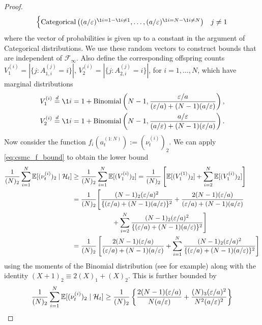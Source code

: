 \begin{proof}
\begin{align*}
\begin{cases}
\operatorname{Categorical}\left( (a/\varepsilon)^{\1{i=1} -\1{i\neq 1}} ,\dots, (a/\varepsilon)^{\1{i=N} -\1{i\neq N}} \right) & j\neq 1
 \end{cases}
\end{align*}
where the vector of probabilities is given up to a constant in the argument of Categorical distributions.
We use these random vectors to construct bounds that are independent of $\mathcal{F}_\infty$.
Also define the corresponding offspring counts $V_1^{(i)} = |\{j: A_{1,i}^{(j)}=i\}|$, $V_2^{(i)} = |\{j: A_{2,i}^{(j)}=i\}|$, for $i=1,\dots,N$, which have marginal distributions
\begin{align*}
& V_1^{(i)} \overset{d}{=} \1{i=1} + \operatorname{Binomial}\left(N-1, \frac{\varepsilon/a}{(\varepsilon/a) + (N-1)(a/\varepsilon)} \right) , \\
& V_2^{(i)} \overset{d}{=} \1{i=1} + \operatorname{Binomial}\left( N-1, \frac{a/\varepsilon}{(a/\varepsilon) + (N-1)(\varepsilon/a)} \right) .
\end{align*}
Now consider the function $f_i(a_t^{(1:N)}) := (\nu_t^{(i)})_2$. We can apply \eqref{eq:csmc_f_bound} to obtain the lower bound
\begin{align*}
\frac{1}{(N)_2} \sum_{i=1}^N \mathbb{E}[ (\nu_t^{(i)})_2 \mid \mathcal{H}_t ]
&\geq \frac{1}{(N)_2} \sum_{i=1}^N \mathbb{E}[ (V_1^{(i)})_2 ]
=  \frac{1}{(N)_2} \left[ \mathbb{E}[ (V_1^{(1)})_2 ] + \sum_{i=2}^N \mathbb{E}[ (V_1^{(i)})_2 ] \right] \\
&= \frac{1}{(N)_2} \Bigg[ \frac{(N-1)_2 (\varepsilon/a)^2}{\{(\varepsilon/a) + (N-1)(a/\varepsilon)\}^2} + \frac{2(N-1)(\varepsilon/a)}{(\varepsilon/a) + (N-1)(a/\varepsilon)}  \\
&\qquad\qquad\qquad + \sum_{i=2}^N \frac{(N-1)_2 (\varepsilon/a)^2}{\{(\varepsilon/a) + (N-1)(a/\varepsilon)\}^2} \Bigg] \\
&= \frac{1}{(N)_2} \left[ \frac{2(N-1)(\varepsilon/a)}{(\varepsilon/a) + (N-1)(a/\varepsilon)} + \sum_{i=1}^N \frac{(N-1)_2 (\varepsilon/a)^2}{\{(\varepsilon/a) + (N-1)(a/\varepsilon)\}^2} \right]
\end{align*}
using the moments of the Binomial distribution (see \cite{mosimann1962} for example) along with the identity $(X+1)_2 \equiv 2(X)_1 +(X)_2$.
This is further bounded by
\begin{align}
\frac{1}{(N)_2} \sum_{i=1}^N \E[ (\nu_t^{(i)})_2 \mid \mathcal{H}_t ]
&\geq \frac{1}{(N)_2} \left\{ \frac{2(N-1)(\varepsilon/a)}{N(a/\varepsilon)} + \frac{(N)_3 (\varepsilon/a)^2}{N^2(a/\varepsilon)^2} \right\} \nonumber\\

\end{align}
\end{proof}
